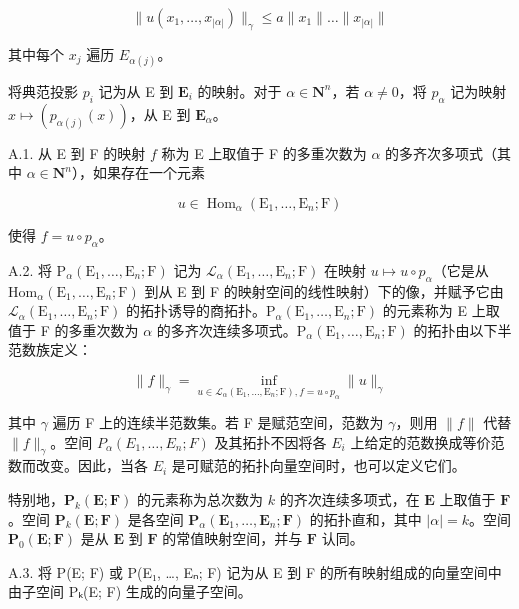 \[
\| u (x _ {1}, \dots , x _ {| \alpha |}) \| _ {\gamma} \leqslant a \| x _ {1} \| \dots \| x _ {| \alpha |} \|
\]

其中每个 \(x_{j}\) 遍历 \(E_{\alpha(j)}\)。

将典范投影 \(p_{i}\) 记为从 E 到 \(\mathbf{E}_{i}\) 的映射。对于 \(\alpha\in\mathbf{N}^{n}\)，若 \(\alpha\neq0\)，将 \(p_{\alpha}\) 记为映射 \(x\mapsto(p_{\alpha(j)}(x))\)，从 E 到 \(\mathbf{E}_{\alpha}\)。

A.1. 从 E 到 F 的映射 \(f\) 称为 E 上取值于 F 的多重次数为 \(\alpha\) 的多齐次多项式（其中 \(\alpha \in \mathbf{N}^{n}\)），如果存在一个元素

\[
u \in \operatorname{Hom} _ {\alpha} (\mathrm{E} _ {1}, \dots , \mathrm{E} _ {n}; \mathrm{F})
\]

使得 \(f = u \circ p_{\alpha}\)。

A.2. 将 \(\mathrm{P}_{\alpha}(\mathrm{E}_{1},\ldots,\mathrm{E}_{n};\mathrm{F})\) 记为 \(\mathcal{L}_{\alpha}(\mathrm{E}_{1},\ldots,\mathrm{E}_{n};\mathrm{F})\) 在映射 \(u\mapsto u\circ p_{\alpha}\)（它是从 \(\mathrm{Hom}_{\alpha}(\mathrm{E}_{1},\ldots,\mathrm{E}_{n};\mathrm{F})\) 到从 E 到 F 的映射空间的线性映射）下的像，并赋予它由 \(\mathcal{L}_{\alpha}(\mathrm{E}_{1},\ldots,\mathrm{E}_{n};\mathrm{F})\) 的拓扑诱导的商拓扑。\(\mathrm{P}_{\alpha}(\mathrm{E}_{1},\ldots,\mathrm{E}_{n};\mathrm{F})\) 的元素称为 E 上取值于 F 的多重次数为 \(\alpha\) 的多齐次连续多项式。\(\mathrm{P}_{\alpha}(\mathrm{E}_{1},\ldots,\mathrm{E}_{n};\mathrm{F})\) 的拓扑由以下半范数族定义：

\[
\| f \| _ {\gamma} = \inf _ {u \in \mathscr {L} _ {\alpha} (\mathrm{E} _ {1}, \dots , \mathrm{E} _ {n}; \mathrm{F}), f = u \circ p _ {\alpha}} \| u \| _ {\gamma}
\]

其中 \(\gamma\) 遍历 F 上的连续半范数集。若 F 是赋范空间，范数为 \(\gamma\)，则用 \(\|f\|\) 代替 \(\|f\|_{\gamma}\)。空间 \(P_{\alpha}(E_{1},\ldots,E_{n};F)\) 及其拓扑不因将各 \(E_{i}\) 上给定的范数换成等价范数而改变。因此，当各 \(E_{i}\) 是可赋范的拓扑向量空间时，也可以定义它们。

特别地，\(\mathbf{P}_{k}(\mathbf{E};\mathbf{F})\) 的元素称为总次数为 \(k\) 的齐次连续多项式，在 \(\mathbf{E}\) 上取值于 \(\mathbf{F}\)。空间 \(\mathbf{P}_{k}(\mathbf{E};\mathbf{F})\) 是各空间 \(\mathbf{P}_{\alpha}(\mathbf{E}_{1},\ldots,\mathbf{E}_{n};\mathbf{F})\) 的拓扑直和，其中 \(|\alpha| = k\)。空间 \(\mathbf{P}_{0}(\mathbf{E};\mathbf{F})\) 是从 \(\mathbf{E}\) 到 \(\mathbf{F}\) 的常值映射空间，并与 \(\mathbf{F}\) 认同。

A.3. 将 P(E; F) 或 P(E₁, \ldots, Eₙ; F) 记为从 E 到 F 的所有映射组成的向量空间中由子空间 Pₖ(E; F) 生成的向量子空间。

